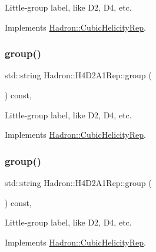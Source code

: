 Little-\/group label, like D2, D4, etc. 

Implements \mbox{\hyperlink{structHadron_1_1CubicHelicityRep_a101a7d76cd8ccdad0f272db44b766113}{Hadron\+::\+Cubic\+Helicity\+Rep}}.

\mbox{\label{structHadron_1_1H4D2A1Rep_a08935df457743813b4a774db746d4b54}} 
\subsubsection{\texorpdfstring{group()}{group()}\hspace{0.1cm}{\footnotesize\ttfamily [3/5]}}
{\footnotesize\ttfamily std\+::string Hadron\+::\+H4\+D2\+A1\+Rep\+::group (\begin{DoxyParamCaption}{ }\end{DoxyParamCaption}) const\hspace{0.3cm}{\ttfamily [inline]}, {\ttfamily [virtual]}}

Little-\/group label, like D2, D4, etc. 

Implements \mbox{\hyperlink{structHadron_1_1CubicHelicityRep_a101a7d76cd8ccdad0f272db44b766113}{Hadron\+::\+Cubic\+Helicity\+Rep}}.

\mbox{\label{structHadron_1_1H4D2A1Rep_a08935df457743813b4a774db746d4b54}} 
\subsubsection{\texorpdfstring{group()}{group()}\hspace{0.1cm}{\footnotesize\ttfamily [4/5]}}
{\footnotesize\ttfamily std\+::string Hadron\+::\+H4\+D2\+A1\+Rep\+::group (\begin{DoxyParamCaption}{ }\end{DoxyParamCaption}) const\hspace{0.3cm}{\ttfamily [inline]}, {\ttfamily [virtual]}}

Little-\/group label, like D2, D4, etc. 

Implements \mbox{\hyperlink{structHadron_1_1CubicHelicityRep_a101a7d76cd8ccdad0f272db44b766113}{Hadron\+::\+Cubic\+Helicity\+Rep}}.

\mbox{\label{structHadron_1_1H4D2A1Rep_a08935df457743813b4a774db746d4b54}} 
